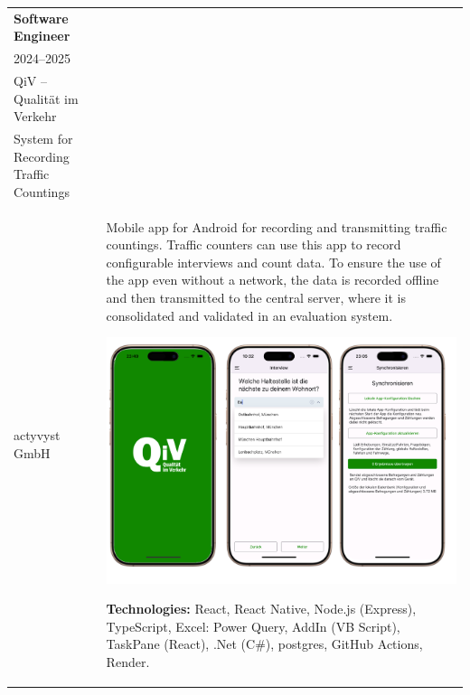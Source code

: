 \documentclass[a4paper,10pt]{article}
\begin{document}
\vspace{1.5em}
\begin{tabularx}{\textwidth}{>{\raggedright}p{4.5cm}X}
  \textbf{\color{sectionblue}Software Engineer} \\
  {\color{sectiongray}2024–2025}                \\
  \vspace{1.5em}
  QiV – Qualit{\"a}t im Verkehr                 \\
  System for Recording Traffic Countings        \\
  {\color{sectiongray}actyvyst GmbH}
   &
  Mobile app for Android for recording and transmitting traffic countings.
  Traffic counters can use this app to record configurable interviews and
  count data. To ensure the use of the app even without a network, the data
  is recorded offline and then transmitted to the central server, where it is
  consolidated and validated in an evaluation system.
  \begin{center}
    \includegraphics[width=0.8\linewidth]{assets/qiv.png}
  \end{center}
  \textbf{Technologies:} React, React Native, Node.js (Express), TypeScript,
  Excel: Power Query, AddIn (VB Script), TaskPane (React), .Net (C\#),
  postgres, GitHub Actions, Render.
\end{tabularx}

\vspace{1em}
\noindent{\color{sectionblue}\rule{\textwidth}{0.4pt}}
\vspace{1em}
\end{document}
